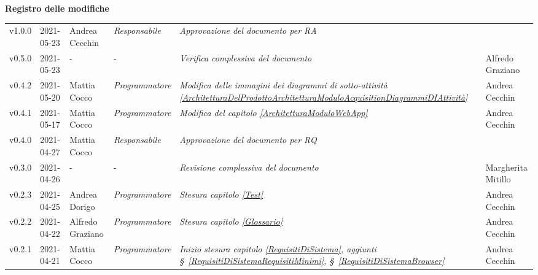\quad
\begin{center}
	\LARGE\textbf{Registro delle modifiche}
\end{center}
\def\tabularxcolumn#1{m{#1}}
{

\begin{center}
	\renewcommand{\arraystretch}{1.4}
	\begin{longtable}[c]{|p{2cm-1\tabcolsep}|p{2cm}|p{3cm-2\tabcolsep}|p{3cm-1.5\tabcolsep}|p{}|p{4cm-2\tabcolsep}|}
		\hline
		\rowcolor{airforceblue}
		\makecell[c]{\textbf{Versione}} & \makecell[c]{\textbf{Data}} & \makecell[c]{\textbf{Autore}} & \makecell[c]{\textbf{Ruolo}} & \makecell[c]{\textbf{Modifica}} &  \makecell[c]{\textbf{Verificatore}}\\
		\hline
		\centering v1.0.0 & 2021-05-23 & Andrea Cecchin & \centering \textit{Responsabile} & \textit{Approvazione del documento per RA} & \\
		\hline
		\hline
		\centering v0.5.0 & 2021-05-23 & \centering- & \centering- & \textit{Verifica complessiva del documento} & Alfredo Graziano\\
		\hline
		\hline
		\centering v0.4.2 & 2021-05-20 & Mattia Cocco & \centering \textit{Programmatore} & \textit{Modifica delle immagini dei diagrammi di sotto-attività \ref{ArchitetturaDelProdottoArchitetturaModuloAcquisitionDiagrammiDIAttività}} & Andrea Cecchin\\
		\hline
		\hline
		\centering v0.4.1 & 2021-05-17 & Mattia Cocco & \centering \textit{Programmatore} & \textit{Modifica del capitolo \ref{ArchitetturaModuloWebApp}} & Andrea Cecchin\\
		\hline
		\centering v0.4.0 & 2021-04-27 & Mattia Cocco & \centering \textit{Responsabile} & \textit{Approvazione del documento per RQ}  & \makecell[c]{-}\\
		\hline
		\hline
		\centering v0.3.0 & 2021-04-26 &\centering - &\centering - & \textit{Revisione complessiva del documento} & Margherita Mitillo\\
		\hline
		\hline
		\centering v0.2.3 & 2021-04-25 & Andrea Dorigo & \centering \textit{Programmatore} & \textit{Stesura capitolo \ref{Test}} & Andrea Cecchin\\
		\hline
		\hline
		\centering v0.2.2 & 2021-04-22 & Alfredo Graziano & \centering \textit{Programmatore} & \textit{Stesura capitolo \ref{Glossario}} & Andrea Cecchin\\
		\hline
		\hline
		\centering v0.2.1 & 2021-04-21 & Mattia Cocco & \centering \textit{Programmatore} & \textit{Inizio stesura capitolo \ref{RequisitiDiSistema}, aggiunti \S~\ref{RequisitiDiSistemaRequisitiMinimi}, \S~\ref{RequisitiDiSistemaBrowser}} & Andrea Cecchin\\

\end{longtable}
\end{center}}
